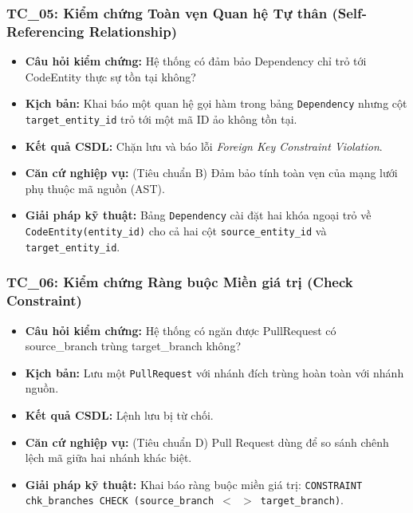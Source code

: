 \subsubsection*{TC\_05: Kiểm chứng Toàn vẹn Quan hệ Tự thân (Self-Referencing Relationship)}
\begin{itemize}
    \item \textbf{Câu hỏi kiểm chứng:} Hệ thống có đảm bảo Dependency chỉ trỏ tới CodeEntity thực sự tồn tại không?
    \item \textbf{Kịch bản:} Khai báo một quan hệ gọi hàm trong bảng \texttt{Dependency} nhưng cột \texttt{target\_entity\_id} trỏ tới một mã ID ảo không tồn tại.
    \item \textbf{Kết quả CSDL:} Chặn lưu và báo lỗi \textit{Foreign Key Constraint Violation}.
    \item \textbf{Căn cứ nghiệp vụ:} (Tiêu chuẩn B) Đảm bảo tính toàn vẹn của mạng lưới phụ thuộc mã nguồn (AST).
    \item \textbf{Giải pháp kỹ thuật:} Bảng \texttt{Dependency} cài đặt hai khóa ngoại trỏ về \texttt{CodeEntity(entity\_id)} cho cả hai cột \texttt{source\_entity\_id} và \texttt{target\_entity\_id}.
\end{itemize}

\subsubsection*{TC\_06: Kiểm chứng Ràng buộc Miền giá trị (Check Constraint)}
\begin{itemize}
    \item \textbf{Câu hỏi kiểm chứng:} Hệ thống có ngăn được PullRequest có source\_branch trùng target\_branch không?
    \item \textbf{Kịch bản:} Lưu một \texttt{PullRequest} với nhánh đích trùng hoàn toàn với nhánh nguồn.
    \item \textbf{Kết quả CSDL:} Lệnh lưu bị từ chối.
    \item \textbf{Căn cứ nghiệp vụ:} (Tiêu chuẩn D) Pull Request dùng để so sánh chênh lệch mã giữa hai nhánh khác biệt.
    \item \textbf{Giải pháp kỹ thuật:} Khai báo ràng buộc miền giá trị: \texttt{CONSTRAINT chk\_branches CHECK (source\_branch $<$ $>$ target\_branch)}.
\end{itemize}


